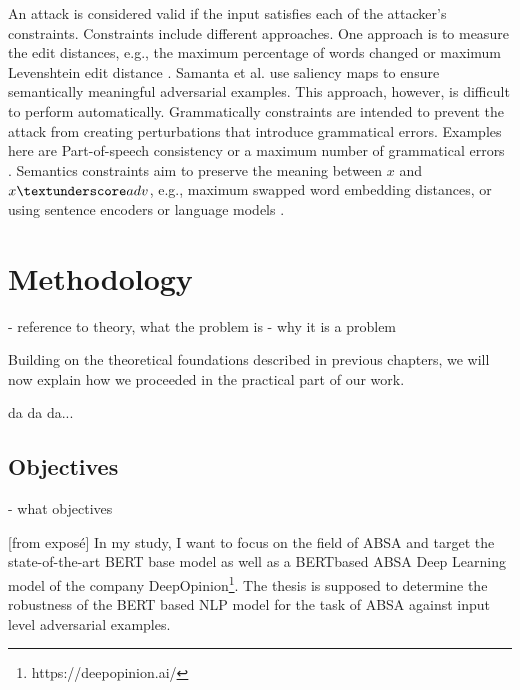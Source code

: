     An attack is considered valid if the input satisfies each of the attacker's constraints. 
    Constraints include different approaches. One approach is to measure the edit distances, e.g., the maximum percentage of words changed \cite{ebrahimi2017hotflip} or maximum Levenshtein edit distance \cite{gao2018black}. Samanta et al. use saliency maps to ensure semantically meaningful adversarial examples\cite{samanta2017towards}. This approach, however, is difficult to perform automatically. Grammatically constraints are intended to prevent the attack from creating perturbations that introduce grammatical errors. Examples here are Part-of-speech consistency or a maximum number of grammatical errors \cite{ebrahimi2017hotflip, jin2019bert}. Semantics constraints aim to preserve the meaning between $x$ and $x\textunderscore adv$, e.g., maximum swapped word embedding distances, or using sentence encoders or language models \cite{cer2018universal, garg2020bae, jin2019bert, li2018textbugger, alzantot2018generating, ebrahimi2017hotflip}.



\section{Methodology}


- reference to theory, what the problem is
- why it is a problem

Building on the theoretical foundations described in previous chapters, we will now explain how we proceeded in the practical part of our work. 

da da da...




\subsection{Objectives}
- what objectives


[from exposé]
In my study, I want to focus on the field of ABSA and target the state-of-the-art BERT base model as well as a BERTbased ABSA Deep Learning model of the company DeepOpinion\footnote{https://deepopinion.ai/}. The thesis is supposed to determine the robustness of the BERT based NLP model for the task of ABSA against input level adversarial examples.


